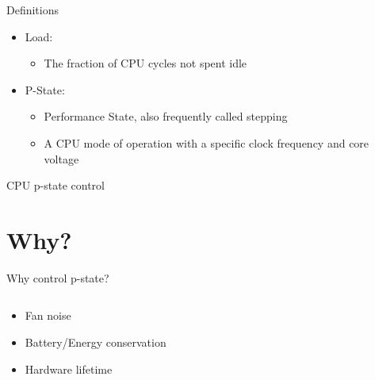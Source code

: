 \documentclass[aspectratio=169]{beamer}
\begin{document}
\begin{frame}{Definitions}
\begin{itemize}
\item Load: \begin{itemize}
      \item<2-> The fraction of CPU cycles not spent idle
      \end{itemize}
\item<3-> P-State: \begin{itemize}
      \item<4-> Performance State, also frequently called stepping
      \item<5-> A CPU mode of operation with a specific clock frequency
                and core voltage
      \end{itemize}
\end{itemize}
\end{frame}

\begin{frame}{CPU p-state control}
\centering
{}
\end{frame}

\section{Why?}

\begin{frame}{Why control p-state?}
\begin{columns}[onlytextwidth]
\begin{column}{0.4\textwidth}
\begin{itemize}
\item<1-> Fan noise
\item<2-> Battery/Energy conservation
\item<3-> Hardware lifetime
\end{itemize}
\end{column}
\begin{column}{0.6\textwidth}
\begin{tikzpicture}[scale=.6]


\end{tikzpicture}
\end{column}
\end{columns}
\end{frame}
\end{document}
